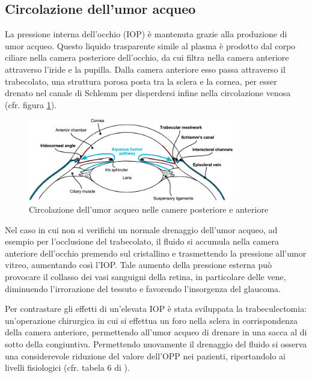 \documentclass{article}
\begin{document}
\subsection{Circolazione dell'umor acqueo}
La pressione interna dell'occhio (IOP) è mantenuta grazie alla produzione di umor acqueo.
Questo liquido trasparente simile al plasma è prodotto dal corpo ciliare nella camera posteriore dell'occhio, da cui filtra nella camera anteriore attraverso l'iride e la pupilla.
Dalla camera anteriore esso passa attraverso il trabecolato, una struttura porosa posta tra la sclera e la cornea, per esser drenato nel canale di Schlemm per disperdersi infine nella circolazione venosa (cfr. figura \ref{umoracqueo}).
\begin{figure}[h]
\begin{center}
\includegraphics[width=0.8\textwidth]{Pictures/umor_acqueo.png}
\caption{Circolazione dell'umor acqueo nelle camere posteriore e anteriore \cite{Tesimmagine}}
\label{umoracqueo}
\end{center}
\end{figure}
Nel caso in cui non si verifichi un normale drenaggio dell'umor acqueo, ad esempio per l'occlusione del trabecolato, il fluido si accumula nella camera anteriore dell'occhio premendo sul cristallino e trasmettendo la pressione all'umor vitreo, aumentando così l'IOP.
Tale aumento della pressione esterna può provocare il collasso dei vasi sanguigni della retina, in particolare delle vene, diminuendo l'irrorazione  del tessuto e favorendo l'insorgenza del glaucoma.

Per contrastare gli effetti di un'elevata IOP è stata sviluppata la trabeculectomia: un'operazione chirurgica in cui si effettua un foro nella sclera in corrispondenza della camera anteriore, permettendo all'umor acqueo di drenare in una sacca al di sotto  della congiuntiva.
Permettendo nuovamente il drenaggio del fluido si osserva una considerevole riduzione del valore dell'OPP nei pazienti, riportandolo ai livelli fisiologici (cfr. tabela 6 di \cite{art1}).
\end{document}

